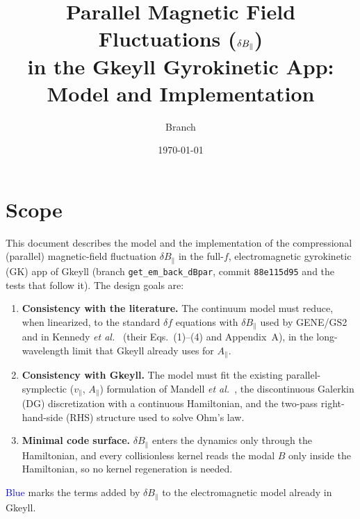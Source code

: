 \documentclass[11pt, letterpaper]{article}
\title{Parallel Magnetic Field Fluctuations ($\dBpar$)\\ in the Gkeyll Gyrokinetic App: Model and Implementation}
\author{Branch \code{get\_em\_back\_dBpar}}
\date{\today}
\newcommand{\dBpar}{\delta B_\parallel}
\newcommand{\vpar}{v_\parallel}
\newcommand{\Apar}{A_\parallel}
\newcommand{\code}[1]{\texttt{#1}}
\newcommand{\new}[1]{\textcolor{blue}{#1}}
\begin{document}
\maketitle

\section{Scope}
This document describes the model and the implementation of the compressional (parallel)
magnetic-field fluctuation $\dBpar$ in the full-$f$, electromagnetic gyrokinetic (GK) app of
Gkeyll (branch \code{get\_em\_back\_dBpar}, commit \code{88e115d95} and the tests that follow it).
The design goals are:
\begin{enumerate}[nosep]
  \item \textbf{Consistency with the literature.} The continuum model must reduce, when linearized,
  to the standard $\delta f$ equations with $\dBpar$ used by GENE/GS2 and in
  Kennedy \emph{et al.}~\cite{Kennedy2024} (their Eqs.~(1)--(4) and Appendix~A), in the
  long-wavelength limit that Gkeyll already uses for $\Apar$.
  \item \textbf{Consistency with Gkeyll.} The model must fit the existing parallel-symplectic
  ($\vpar$, $\Apar$) formulation of Mandell \emph{et al.}~\cite{Mandell2020}, the discontinuous
  Galerkin (DG) discretization with a continuous Hamiltonian, and the two-pass right-hand-side
  (RHS) structure used to solve Ohm's law.
  \item \textbf{Minimal code surface.} $\dBpar$ enters the dynamics only through the Hamiltonian,
  and every collisionless kernel reads the modal $B$ only inside the Hamiltonian, so no kernel
  regeneration is needed.
\end{enumerate}
\new{Blue} marks the terms added by $\dBpar$ to the electromagnetic model already in Gkeyll.
\end{document}
